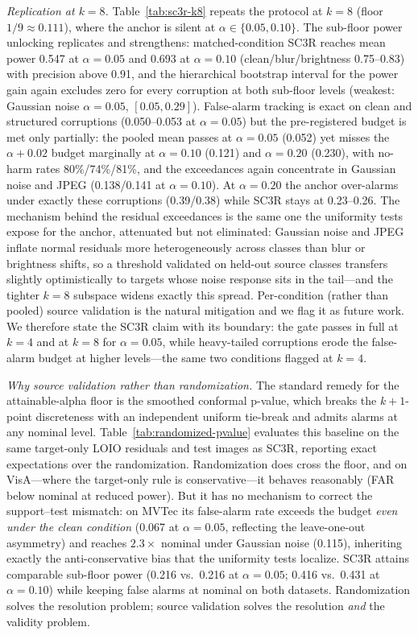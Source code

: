 
\emph{Replication at $k{=}8$.} Table~\ref{tab:sc3r-k8} repeats the protocol at $k{=}8$ (floor $1/9\approx0.111$), where the anchor is silent at $\alpha\in\{0.05,0.10\}$. The sub-floor power unlocking replicates and strengthens: matched-condition SC3R reaches mean power 0.547 at $\alpha{=}0.05$ and 0.693 at $\alpha{=}0.10$ (clean/blur/brightness 0.75--0.83) with precision above 0.91, and the hierarchical bootstrap interval for the power gain again excludes zero for every corruption at both sub-floor levels (weakest: Gaussian noise $\alpha{=}0.05$, $[0.05,0.29]$). False-alarm tracking is exact on clean and structured corruptions (0.050--0.053 at $\alpha{=}0.05$) but the pre-registered budget is met only partially: the pooled mean passes at $\alpha{=}0.05$ (0.052) yet misses the $\alpha{+}0.02$ budget marginally at $\alpha{=}0.10$ (0.121) and $\alpha{=}0.20$ (0.230), with no-harm rates 80\%/74\%/81\%, and the exceedances again concentrate in Gaussian noise and JPEG (0.138/0.141 at $\alpha{=}0.10$). At $\alpha{=}0.20$ the anchor over-alarms under exactly these corruptions (0.39/0.38) while SC3R stays at 0.23--0.26. The mechanism behind the residual exceedances is the same one the uniformity tests expose for the anchor, attenuated but not eliminated: Gaussian noise and JPEG inflate normal residuals more heterogeneously across classes than blur or brightness shifts, so a threshold validated on held-out source classes transfers slightly optimistically to targets whose noise response sits in the tail---and the tighter $k{=}8$ subspace widens exactly this spread. Per-condition (rather than pooled) source validation is the natural mitigation and we flag it as future work. We therefore state the SC3R claim with its boundary: the gate passes in full at $k{=}4$ and at $k{=}8$ for $\alpha{=}0.05$, while heavy-tailed corruptions erode the false-alarm budget at higher levels---the same two conditions flagged at $k{=}4$.


\emph{Why source validation rather than randomization.} The standard remedy for the attainable-alpha floor is the smoothed conformal p-value, which breaks the $k{+}1$-point discreteness with an independent uniform tie-break and admits alarms at any nominal level. Table~\ref{tab:randomized-pvalue} evaluates this baseline on the same target-only LOIO residuals and test images as SC3R, reporting exact expectations over the randomization. Randomization does cross the floor, and on VisA---where the target-only rule is conservative---it behaves reasonably (FAR below nominal at reduced power). But it has no mechanism to correct the support--test mismatch: on MVTec its false-alarm rate exceeds the budget \emph{even under the clean condition} (0.067 at $\alpha{=}0.05$, reflecting the leave-one-out asymmetry) and reaches $2.3\times$ nominal under Gaussian noise (0.115), inheriting exactly the anti-conservative bias that the uniformity tests localize. SC3R attains comparable sub-floor power (0.216 vs.\ 0.216 at $\alpha{=}0.05$; 0.416 vs.\ 0.431 at $\alpha{=}0.10$) while keeping false alarms at nominal on both datasets. Randomization solves the resolution problem; source validation solves the resolution \emph{and} the validity problem.

